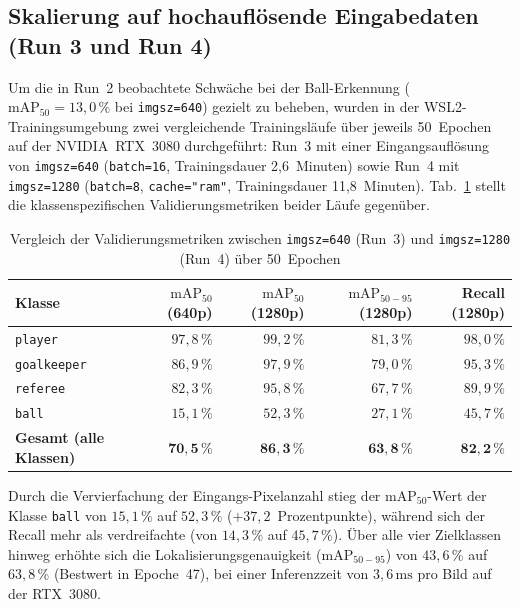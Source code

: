 \subsection{Skalierung auf hochauflösende Eingabedaten (Run 3 und Run 4)}

Um die in Run~2 beobachtete Schwäche bei der Ball-Erkennung ($\text{mAP}_{50} = 13{,}0\,\%$ bei \texttt{imgsz=640}) gezielt zu beheben, wurden in der WSL2-Trainingsumgebung zwei vergleichende Trainingsläufe über jeweils 50~Epochen auf der NVIDIA~RTX~3080 durchgeführt: Run~3 mit einer Eingangsauflösung von \texttt{imgsz=640} (\texttt{batch=16}, Trainingsdauer 2,6~Minuten) sowie Run~4 mit \texttt{imgsz=1280} (\texttt{batch=8}, \texttt{cache="ram"}, Trainingsdauer 11,8~Minuten). Tab.~\ref{tab:vergleich-640-1280} stellt die klassenspezifischen Validierungsmetriken beider Läufe gegenüber.

\begin{table}[htbp]
  \caption{Vergleich der Validierungsmetriken zwischen \texttt{imgsz=640} (Run~3) und \texttt{imgsz=1280} (Run~4) über 50~Epochen}
  \label{tab:vergleich-640-1280}
  \centering
  \begin{tabular}{@{}lrrrr@{}}
    \toprule
    \bfseries Klasse & \bfseries $\text{mAP}_{50}$ (640p) & \bfseries $\text{mAP}_{50}$ (1280p) & \bfseries $\text{mAP}_{50-95}$ (1280p) & \bfseries Recall (1280p) \\
    \midrule
    \texttt{player}     & $97{,}8\,\%$ & $99{,}2\,\%$ & $81{,}3\,\%$ & $98{,}0\,\%$ \\
    \texttt{goalkeeper} & $86{,}9\,\%$ & $97{,}9\,\%$ & $79{,}0\,\%$ & $95{,}3\,\%$ \\
    \texttt{referee}    & $82{,}3\,\%$ & $95{,}8\,\%$ & $67{,}7\,\%$ & $89{,}9\,\%$ \\
    \texttt{ball}       & $15{,}1\,\%$ & $52{,}3\,\%$ & $27{,}1\,\%$ & $45{,}7\,\%$ \\
    \midrule
    \bfseries Gesamt (alle Klassen) & $\mathbf{70{,}5\,\%}$ & $\mathbf{86{,}3\,\%}$ & $\mathbf{63{,}8\,\%}$ & $\mathbf{82{,}2\,\%}$ \\
    \bottomrule
  \end{tabular}
\end{table}

Durch die Vervierfachung der Eingangs-Pixelanzahl stieg der $\text{mAP}_{50}$-Wert der Klasse \texttt{ball} von $15{,}1\,\%$ auf $52{,}3\,\%$ ($+37{,}2$~Prozentpunkte), während sich der Recall mehr als verdreifachte (von $14{,}3\,\%$ auf $45{,}7\,\%$). Über alle vier Zielklassen hinweg erhöhte sich die Lokalisierungsgenauigkeit ($\text{mAP}_{50-95}$) von $43{,}6\,\%$ auf $63{,}8\,\%$ (Bestwert in Epoche~47), bei einer Inferenzzeit von $3{,}6\,\text{ms}$ pro Bild auf der RTX~3080.

